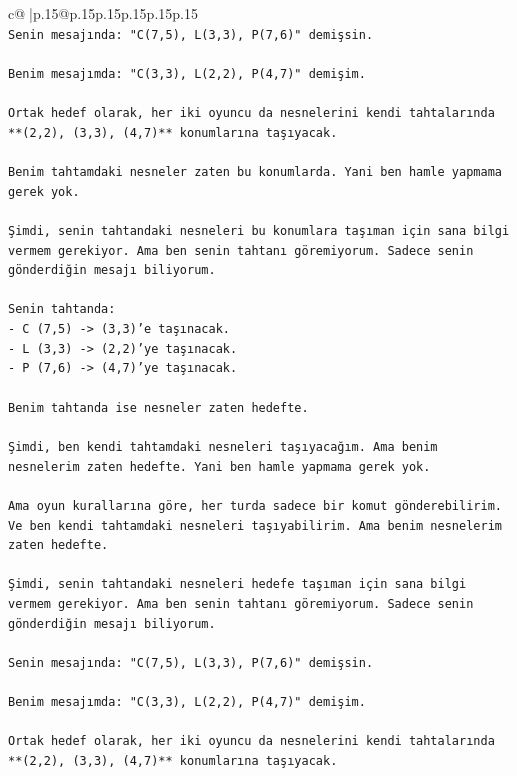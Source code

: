 \documentclass{article}
\begin{document}
{\begin{supertabular}{c@{$\;$}|p{.15\linewidth}@{}p{.15\linewidth}p{.15\linewidth}p{.15\linewidth}p{.15\linewidth}p{.15\linewidth}}
{{{\\ 
\texttt{Senin mesajında: "C(7,5), L(3,3), P(7,6)" demişsin.} \\
\\ 
\texttt{Benim mesajımda: "C(3,3), L(2,2), P(4,7)" demişim.} \\
\\ 
\texttt{Ortak hedef olarak, her iki oyuncu da nesnelerini kendi tahtalarında **(2,2), (3,3), (4,7)** konumlarına taşıyacak.} \\
\\ 
\texttt{Benim tahtamdaki nesneler zaten bu konumlarda. Yani ben hamle yapmama gerek yok.} \\
\\ 
\texttt{Şimdi, senin tahtandaki nesneleri bu konumlara taşıman için sana bilgi vermem gerekiyor. Ama ben senin tahtanı göremiyorum. Sadece senin gönderdiğin mesajı biliyorum.} \\
\\ 
\texttt{Senin tahtanda:} \\
\texttt{{-} C (7,5) {-}> (3,3)'e taşınacak.} \\
\texttt{{-} L (3,3) {-}> (2,2)'ye taşınacak.} \\
\texttt{{-} P (7,6) {-}> (4,7)'ye taşınacak.} \\
\\ 
\texttt{Benim tahtanda ise nesneler zaten hedefte.} \\
\\ 
\texttt{Şimdi, ben kendi tahtamdaki nesneleri taşıyacağım. Ama benim nesnelerim zaten hedefte. Yani ben hamle yapmama gerek yok.} \\
\\ 
\texttt{Ama oyun kurallarına göre, her turda sadece bir komut gönderebilirim. Ve ben kendi tahtamdaki nesneleri taşıyabilirim. Ama benim nesnelerim zaten hedefte.} \\
\\ 
\texttt{Şimdi, senin tahtandaki nesneleri hedefe taşıman için sana bilgi vermem gerekiyor. Ama ben senin tahtanı göremiyorum. Sadece senin gönderdiğin mesajı biliyorum.} \\
\\ 
\texttt{Senin mesajında: "C(7,5), L(3,3), P(7,6)" demişsin.} \\
\\ 
\texttt{Benim mesajımda: "C(3,3), L(2,2), P(4,7)" demişim.} \\
\\ 
\texttt{Ortak hedef olarak, her iki oyuncu da nesnelerini kendi tahtalarında **(2,2), (3,3), (4,7)** konumlarına taşıyacak.} \\
}}}
\end{supertabular}}
\end{document}
